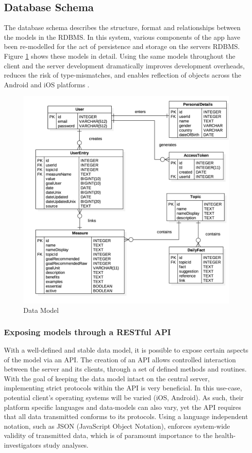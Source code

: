 \subsection{Database Schema}
The database schema describes the structure, format and relationships between the models in the RDBMS. In this system, various components of the app have been re-modelled for the act of persistence and storage on the servers RDBMS. Figure \ref{fig: database-model} shows these models in detail. Using the same models throughout the client and the server development dramatically improves development overheads, reduces the risk of type-mismatches, and enables reflection of objects across the Android and iOS platforms \cite{Thalheim2000}.
\begin{figure}[h]
    \centering
    \includegraphics[scale=0.3, angle=0]{Files/prevention-study-1/figures/database-model}
    \caption{Data Model}
    \label{fig: database-model}
\end{figure}


\subsubsection{Exposing models through a RESTful API} \label{subsection-api}
With a well-defined and stable data model, it is possible to expose certain aspects of the model via an API. The creation of an API allows controlled interaction between the server and its clients, through a set of defined methods and routines. With the goal of keeping the data model intact on the central server, implementing strict protocols within the API is very beneficial. In this use-case, potential client's operating systems will be varied (iOS, Android). As such, their platform specific languages and data-models can also vary, yet the API requires that all data transmitted conforms to its protocols. Using a language independent notation, such as JSON (JavaScript Object Notation), enforces system-wide validity of transmitted data, which is of paramount importance to the health-investigators study analyses.

